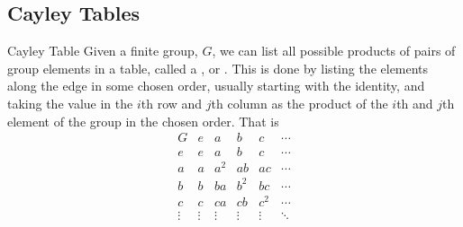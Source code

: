 \documentclass[fleqn]{NotesClass}
\begin{document}
    \subsection{Cayley Tables}
    \begin{dfn}{Cayley Table}{}
        Given a finite group, \(G\), we can list all possible products of pairs of group elements in a table, called a , or .
        This is done by listing the elements along the edge in some chosen order, usually starting with the identity, and taking the value in the \(i\)th row and \(j\)th column as the product of the \(i\)th and \(j\)th element of the group in the chosen order.
        That is
        \begin{equation}
            \begin{array}{c|ccccc}
                G & e & a & b & c & \cdots \\\hline
                e & e & a & b & c & \cdots \\
                a & a & a^2 & ab & ac & \cdots \\
                b & b & ba & b^2 & bc & \cdots \\
                c & c & ca & cb & c^2 & \cdots \\
                \vdots & \vdots &  \vdots & \vdots & \vdots & \ddots
            \end{array}
        \end{equation}
    \end{dfn}
    
\end{document}
